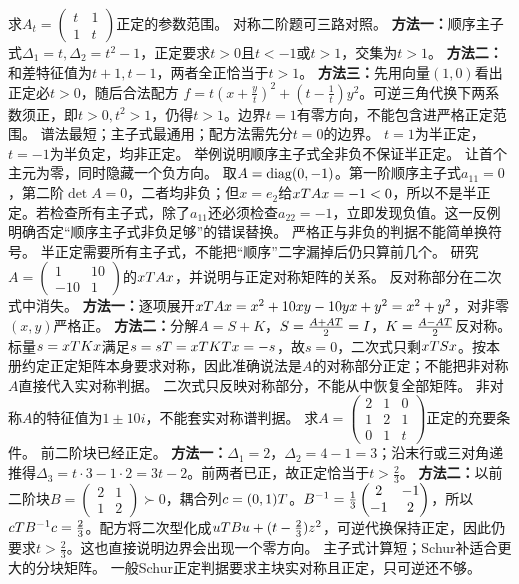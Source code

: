 {求$A_t=\begin{pmatrix}t&1\\1&t\end{pmatrix}$正定的参数范围。}
{对称二阶题可三路对照。}
{\textbf{方法一：}顺序主子式$\Delta_1=t,\Delta_2=t^2-1$，正定要求$t>0$且$t<-1$或$t>1$，交集为$t>1$。
\textbf{方法二：}和差特征值为$t+1,t-1$，两者全正恰当于$t>1$。
\textbf{方法三：}先用向量$(1,0)$看出正定必$t>0$，随后合法配方
$f=t(x+\frac{y}{t})^2+(t-\frac{1}{t})y^2$。可逆三角代换下两系数须正，即$t>0,t^2>1$，仍得$t>1$。边界$t=1$有零方向，不能包含进严格正定范围。}
{谱法最短；主子式最通用；配方法需先分$t=0$的边界。}
{$t=1$为半正定，$t=-1$为半负定，均非正定。}
{举例说明顺序主子式全非负不保证半正定。}
{让首个主元为零，同时隐藏一个负方向。}
{取$A=\operatorname{diag}(0,-1)$。第一阶顺序主子式$a_{11}=0$，第二阶$\det A=0$，二者均非负；但$x=e_2$给$xT Ax=-1<0$，所以不是半正定。若检查所有主子式，除了$a_{11}$还必须检查$a_{22}=-1$，立即发现负值。这一反例明确否定“顺序主子式非负足够”的错误替换。}
{严格正与非负的判据不能简单换符号。}
{半正定需要所有主子式，不能把“顺序”二字漏掉后仍只算前几个。}
{研究$A=\begin{pmatrix}1&10\\-10&1\end{pmatrix}$的$xT Ax$，并说明与正定对称矩阵的关系。}
{反对称部分在二次式中消失。}
{\textbf{方法一：}逐项展开$xT Ax=x^2+10xy-10yx+y^2=x^2+y^2$，对非零$(x,y)$严格正。
\textbf{方法二：}分解$A=S+K$，$S=\frac{A+AT}{2}=I$，$K=\frac{A-AT}{2}$反对称。标量$s=xT Kx$满足$s=sT=xT KT x=-s$，故$s=0$，二次式只剩$xT Sx$。按本册约定正定矩阵本身要求对称，因此准确说法是$A$的对称部分正定；不能把非对称$A$直接代入实对称判据。}
{二次式只反映对称部分，不能从中恢复全部矩阵。}
{非对称$A$的特征值为$1\pm10i$，不能套实对称谱判据。}
{求$A=\begin{pmatrix}2&1&0\\1&2&1\\0&1&t\end{pmatrix}$正定的充要条件。}
{前二阶块已经正定。}
{\textbf{方法一：}$\Delta_1=2$，$\Delta_2=4-1=3$；沿末行或三对角递推得$\Delta_3=t\cdot3-1\cdot2=3t-2$。前两者已正，故正定恰当于$t>\frac{2}{3}$。
\textbf{方法二：}以前二阶块$B=\begin{pmatrix}2&1\\1&2\end{pmatrix}\succ0$，耦合列$c=(0,1)T$。$B^{-1}=\frac13\begin{pmatrix}2&-1\\-1&2\end{pmatrix}$，所以$cT B^{-1} c=\frac{2}{3}$。配方将二次型化成$uT Bu+(t-\frac{2}{3})z^2$，可逆代换保持正定，因此仍要求$t>\frac{2}{3}$。这也直接说明边界会出现一个零方向。}
{主子式计算短；Schur补适合更大的分块矩阵。}
{一般Schur正定判据要求主块实对称且正定，只可逆还不够。}

